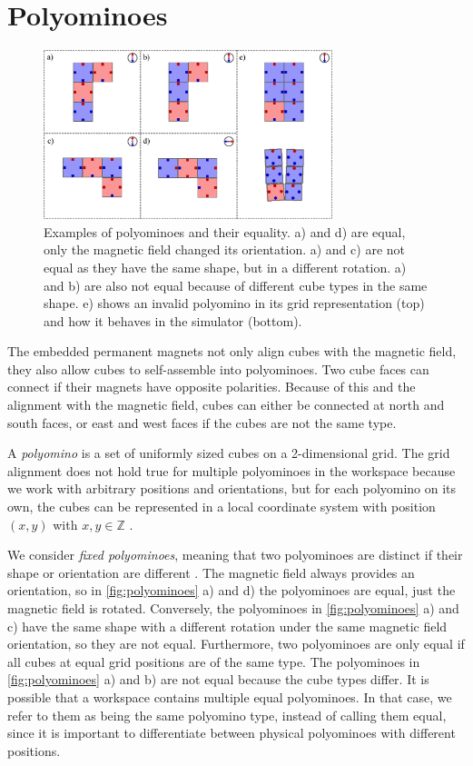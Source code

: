 \section{Polyominoes}
\label{sec:polys}

\begin{figure}
	\centering
	\includegraphics[width=0.75\textwidth]{figures/polyominoes.pdf}
	\caption[Examples of polyominoes and their equality]{Examples of polyominoes and their equality. a) and d) are equal, only the magnetic field changed its orientation. a) and c) are not equal as they have the same shape, but in a different rotation. a) and b) are also not equal because of different cube types in the same shape. e) shows an invalid polyomino in its grid representation (top) and how it behaves in the simulator (bottom).}
	\label{fig:polyominoes}
\end{figure}

The embedded permanent magnets not only align cubes with the magnetic field, they also allow cubes to self-assemble into polyominoes.
Two cube faces can connect if their magnets have opposite polarities.
Because of this and the alignment with the magnetic field, cubes can either be connected at north and south faces, or east and west faces if the cubes are not the same type.

A \textit{polyomino} is a set of uniformly sized cubes on a 2-dimensional grid.
The grid alignment does not hold true for multiple polyominoes in the workspace because we work with arbitrary positions and orientations, but for each polyomino on its own, the cubes can be represented in a local coordinate system with position $(x,y)$ with $x,y \in \mathbb{Z}$ \cite{Lu2021}.


We consider \textit{fixed polyominoes}, meaning that two polyominoes are distinct if their shape or orientation are different \cite{Lu2021}.
The magnetic field always provides an orientation, so in \autoref{fig:polyominoes} a) and d) the polyominoes are equal, just the magnetic field is rotated.
Conversely, the polyominoes in \autoref{fig:polyominoes} a) and c) have the same shape with a different rotation under the same magnetic field orientation, so they are not equal.
Furthermore, two polyominoes are only equal if all cubes at equal grid positions are of the same type.
The polyominoes in \autoref{fig:polyominoes} a) and b) are not equal because the cube types differ.
It is possible that a workspace contains multiple equal polyominoes.
In that case, we refer to them as being the same polyomino type, instead of calling them equal, since it is important to differentiate between physical polyominoes with different positions.

